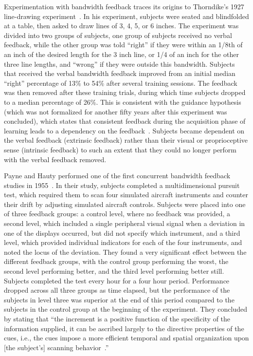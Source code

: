 \documentclass[float=false, crop=false]{standalone}
\begin{document}
Experimentation with bandwidth feedback traces its origins to Thorndike's 1927 line-drawing experiment~\cite{thorndike1927law}.
In his experiment, subjects were seated and blindfolded at a table, then asked to draw lines of 3, 4, 5, or 6 inches.
The experiment was divided into two groups of subjects, one group of subjects received no verbal feedback, while the other group was told ``right'' if they were within an 1/8th of an inch of the desired length for the 3 inch line, or 1/4 of an inch for the other three line lengths, and ``wrong'' if they were outside this bandwidth.
Subjects that received the verbal bandwidth feedback improved from an initial median ``right'' percentage of 13\% to 54\% after several training sessions.
The feedback was then removed after these training trials, during which time subjects dropped to a median percentage of 26\%.
This is consistent with the guidance hypothesis (which was not formalized for another fifty years after this experiment was concluded), which states that consistent feedback during the acquisition phase of learning leads to a dependency on the feedback~\cite{salmoni1984knowledge}.
Subjects became dependent on the verbal feedback (extrinsic feedback) rather than their visual or proprioceptive sense (intrinsic feedback) to such an extent that they could no longer perform with the verbal feedback removed.

Payne and Hauty performed one of the first concurrent bandwidth feedback studies in 1955~\cite{payne1955effect}.
In their study, subjects completed a multidimensional pursuit test, which required them to scan four simulated aircraft instruments and counter their drift by adjusting simulated aircraft controls.
Subjects were placed into one of three feedback groups: a control level, where no feedback was provided, a second level, which included a single peripheral visual signal when a deviation in one of the displays occurred, but did not specify which instrument, and a third level, which provided individual indicators for each of the four instruments, and noted the locus of the deviation.
They found a very significant effect between the different feedback groups, with the control group performing the worst, the second level performing better, and the third level performing better still.
Subjects completed the test every hour for a four hour period.
Performance dropped across all three groups as time elapsed, but the performance of the subjects in level three was superior at the end of this period compared to the subjects in the control group at the beginning of the experiment.
They concluded by stating that ``the increment is a positive function of the specificity of the information supplied, it can be ascribed largely to the directive properties of the cues, i.e., the cues impose a more efficient temporal and spatial organization upon [the subject's] scanning behavior~\cite{payne1955effect}.''
\end{document}
